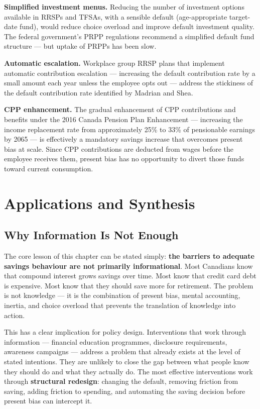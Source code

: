 \documentclass[12pt, letterpaper]{article}
\begin{document}
\textbf{Simplified investment menus.} Reducing the number of investment options available in RRSPs and TFSAs, with a sensible default (age-appropriate target-date fund), would reduce choice overload and improve default investment quality. The federal government's PRPP regulations recommend a simplified default fund structure --- but uptake of PRPPs has been slow.

\textbf{Automatic escalation.} Workplace group RRSP plans that implement automatic contribution escalation --- increasing the default contribution rate by a small amount each year unless the employee opts out --- address the stickiness of the default contribution rate identified by Madrian and Shea.

\textbf{CPP enhancement.} The gradual enhancement of CPP contributions and benefits under the 2016 Canada Pension Plan Enhancement --- increasing the income replacement rate from approximately 25\% to 33\% of pensionable earnings by 2065 --- is effectively a mandatory savings increase that overcomes present bias at scale. Since CPP contributions are deducted from wages before the employee receives them, present bias has no opportunity to divert those funds toward current consumption.

\medskip


\section{Applications and Synthesis}



\subsection{Why Information Is Not Enough}


The core lesson of this chapter can be stated simply: \textbf{the barriers to adequate savings behaviour are not primarily informational}. Most Canadians know that compound interest grows savings over time. Most know that credit card debt is expensive. Most know that they should save more for retirement. The problem is not knowledge --- it is the combination of present bias, mental accounting, inertia, and choice overload that prevents the translation of knowledge into action.

This has a clear implication for policy design. Interventions that work through information --- financial education programmes, disclosure requirements, awareness campaigns --- address a problem that already exists at the level of stated intentions. They are unlikely to close the gap between what people know they should do and what they actually do. The most effective interventions work through \textbf{structural redesign}: changing the default, removing friction from saving, adding friction to spending, and automating the saving decision before present bias can intercept it.
\end{document}
